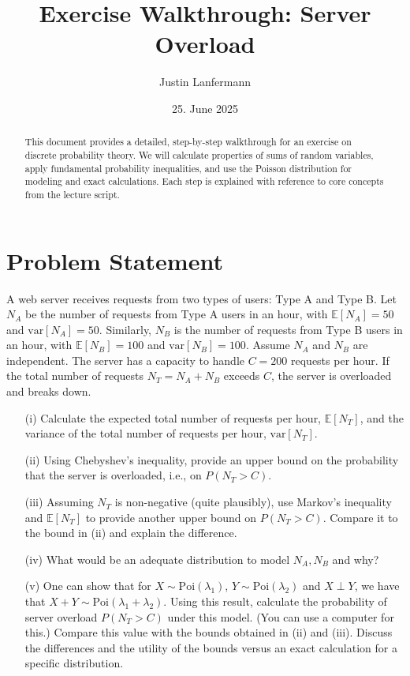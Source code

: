 \documentclass[11pt,a4paper]{article}
\author{Justin Lanfermann}
\title{Exercise Walkthrough: Server Overload}
\date{25. June 2025}
\begin{document}
\maketitle

\begin{abstract}
    This document provides a detailed, step-by-step walkthrough for an exercise on discrete probability theory. We will calculate properties of sums of random variables, apply fundamental probability inequalities, and use the Poisson distribution for modeling and exact calculations. Each step is explained with reference to core concepts from the lecture script.
\end{abstract}

\section{Problem Statement}

A web server receives requests from two types of users: Type A and Type B. Let $N_A$ be the number of requests from Type A users in an hour, with $\mathbb{E}[N_A] = 50$ and $\text{var}[N_A] = 50$. Similarly, $N_B$ is the number of requests from Type B users in an hour, with $\mathbb{E}[N_B] = 100$ and $\text{var}[N_B] = 100$. Assume $N_A$ and $N_B$ are independent. The server has a capacity to handle $C = 200$ requests per hour. If the total number of requests $N_T = N_A + N_B$ exceeds $C$, the server is overloaded and breaks down.

\begin{enumerate}
    \item[(i)] Calculate the expected total number of requests per hour, $\mathbb{E}[N_T]$, and the variance of the total number of requests per hour, $\text{var}[N_T]$.
    \item[(ii)] Using Chebyshev’s inequality, provide an upper bound on the probability that the server is overloaded, i.e., on $P(N_T > C)$.
    \item[(iii)] Assuming $N_T$ is non-negative (quite plausibly), use Markov’s inequality and $\mathbb{E}[N_T]$ to provide another upper bound on $P(N_T > C)$. Compare it to the bound in (ii) and explain the difference.
    \item[(iv)] What would be an adequate distribution to model $N_A, N_B$ and why?
    \item[(v)] One can show that for $X \sim \text{Poi}(\lambda_1)$, $Y \sim \text{Poi}(\lambda_2)$ and $X \perp Y$, we have that $X+Y \sim \text{Poi}(\lambda_1+\lambda_2)$. Using this result, calculate the probability of server overload $P(N_T > C)$ under this model. (You can use a computer for this.) Compare this value with the bounds obtained in (ii) and (iii). Discuss the differences and the utility of the bounds versus an exact calculation for a specific distribution.
\end{enumerate}
\end{document}
